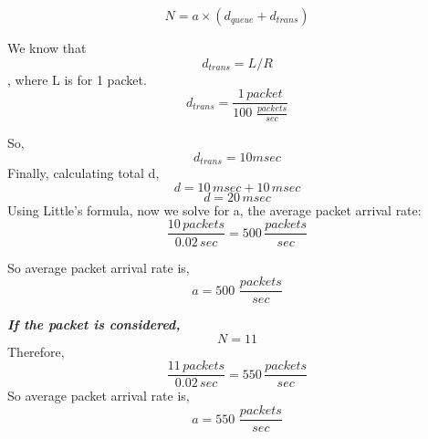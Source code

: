 \documentclass[12pt]{article}
\begin{document}
\begin{enumerate}[label=(\alph*)]
    \begin{equation*}
        N= a \times (d_{queue}+d_{trans})
    \end{equation*}
    
    We know that 
    \begin{equation*}
        d_{trans} = L/R    
    \end{equation*}
    , where L is for 1 packet. \\
    \begin{equation*}
        d_{trans} = \frac{1 \, packet}{100 \, \, \frac{packets}{sec}}    
    \end{equation*}
    
    So,
    \begin{equation*}
        d_{trans} = 10 msec
    \end{equation*}
    Finally, calculating total d,
    \begin{equation*}
        d = 10 \, msec + 10 \, msec
    \end{equation*}
    \begin{equation*}
        d = 20 \, msec
    \end{equation*}
    Using Little’s formula, now we solve for a, the average packet arrival rate:
    \begin{equation*}
        \frac{10 \, packets}{0.02 \, sec} = 500 \, \frac{packets}{sec}    
    \end{equation*}
    
    So average packet arrival rate is,
    \begin{equation*}
        a = 500 \, \, \frac {packets}{sec}
    \end{equation*}
    
    \textit{\textbf{If the  packet is considered,}}
    \begin{equation*}
        N = 11
    \end{equation*}
    Therefore,
    \begin{equation*}
        \frac{11 \, packets}{0.02 \, sec} = 550 \, \frac{packets}{sec}
    \end{equation*}
    So average packet arrival rate is,
    \begin{equation*}
        a = 550 \, \, \frac {packets}{sec}
    \end{equation*}
    \end{enumerate}
    
\end{document}
